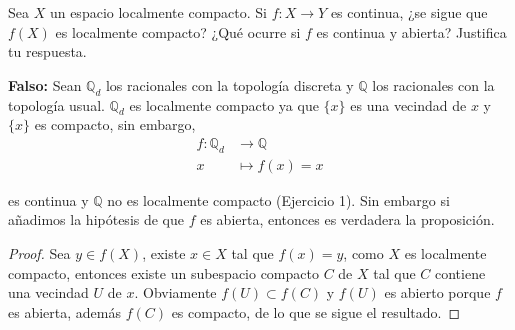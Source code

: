 
\item Sea $X$ un espacio localmente compacto. Si $f: X \rightarrow Y$ es continua, ¿se sigue que $f(X)$ es localmente compacto? ¿Qué ocurre si $f$ es continua y abierta? Justifica tu respuesta.

\textbf{Falso:} Sean $\mathbb{Q}_d$ los racionales con la topología discreta y $\mathbb{Q}$ los racionales con la topología usual. $\mathbb{Q}_d$ es localmente compacto ya que $\{x\}$ es una vecindad de $x$ y $\{x\}$ es compacto, sin embargo,
\begin{align*}
    f : \mathbb{Q}_d &\longrightarrow \mathbb{Q} \\
    x &\longmapsto f(x) = x
\end{align*}

es continua y $\mathbb{Q}$ no es localmente compacto (Ejercicio 1). Sin embargo si añadimos la hipótesis de que $f$ es abierta, entonces es verdadera la proposición.

\begin{proof}
    Sea $y\in f(X)$, existe $x\in X$ tal que $f(x)=y$, como $X$ es localmente compacto, entonces existe un subespacio compacto $C$ de $X$ tal que $C$ contiene una vecindad $U$ de $x$. Obviamente $f(U)\subset f(C)$ y $f(U)$ es abierto porque $f$ es abierta, además $f(C)$ es compacto, de lo que se sigue el resultado. 
\end{proof}
    
